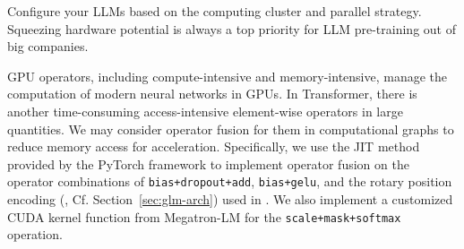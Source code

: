 {

\begin{insight}
\rm Configure your LLMs based on the computing cluster and parallel strategy. Squeezing hardware potential is always a top priority for LLM pre-training out of big companies.
\end{insight}

GPU operators, including compute-intensive and memory-intensive, manage the computation of modern neural networks in GPUs. 
In Transformer, there is another time-consuming access-intensive element-wise operators in large quantities. 
We may consider operator fusion for them in computational graphs to reduce memory access for acceleration. 
Specifically, we use the JIT method provided by the PyTorch framework to implement operator fusion on the operator combinations of \texttt{bias+dropout+add}, \texttt{bias+gelu}, and the rotary position encoding (\cite{su2021roformer}, Cf. Section~\ref{sec:glm-arch}) used in \glm. 
We also implement a customized CUDA kernel function from Megatron-LM for the \texttt{scale+mask+softmax} operation. 

}%

